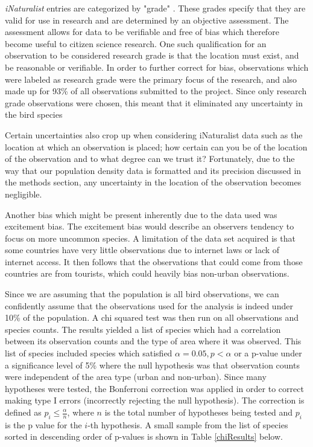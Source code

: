 \documentclass{article}
\begin{document}
\textit{iNaturalist} entries are categorized by "grade" \cite{researchGradeiNat}. These grades specify that they are valid for use in research and are determined by an objective assessment. The assessment allows for data to be verifiable and free of bias which therefore become useful to citizen science research. One such qualification for an observation to be considered research grade is that the location must exist, and be reasonable or verifiable. In order to further correct for bias, observations which were labeled as research grade were the primary focus of the research, and also made up for 93\% of all observations submitted to the project. Since only research grade observations were chosen, this meant that it eliminated any uncertainty in the bird species

Certain uncertainties also crop up when considering iNaturalist data such as the location at which an observation is placed; how certain can you be of the location of the observation and to what degree can we trust it? Fortunately, due to the way that our population density data is formatted and its precision discussed in the methods section, any uncertainty in the location of the observation becomes negligible. 

Another bias which might be present inherently due to the data used was excitement bias. The excitement bias would describe an observers tendency to focus on more uncommon species. A limitation of the data set acquired is that some countries have very little observations due to internet laws or lack of internet access. It then follows that the observations that could come from those countries are from tourists, which could heavily bias non-urban observations. 

Since we are assuming that the population is all bird observations, we can confidently assume that the observations used for the analysis is indeed under 10\% of the population. A chi squared test was then run on all observations and species counts. The results yielded a list of species which had a correlation between its observation counts and the type of area where it was observed. This list of species included species which satisfied $\alpha = 0.05, p < \alpha$ or a p-value under a significance level of 5\% where the null hypothesis was that observation counts were independent of the area type (urban and non-urban). Since many hypotheses were tested, the Bonferroni correction was applied in order to correct making type I errors (incorrectly rejecting the null hypothesis). The correction is defined as $p_i \leq \frac{\alpha}{n}$, where $n$ is the total number of hypotheses being tested and $p_i$ is the p value for the $i$-th hypothesis. A small sample from the list of species sorted in descending order of p-values is shown in Table \ref{chiResults} below.
\end{document}
